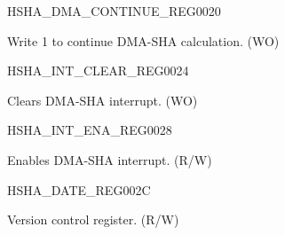 \begin{register}{H}{SHA\_DMA\_CONTINUE\_REG}{\hexprefix{}0020}\label{regdesc:SHADMACONTINUEREG}
%
%
\regnewline%
\begin{regdesc}\begin{reglist}
\label{fielddesc:SHADMACONTINUE}\item [SHA\_DMA\_CONTINUE] Write 1 to continue DMA-SHA calculation. (WO)
\end{reglist}\end{regdesc}
\end{register}


\begin{register}{H}{SHA\_INT\_CLEAR\_REG}{\hexprefix{}0024}\label{regdesc:SHAINTCLEARREG}
%
%
\regnewline%
\begin{regdesc}\begin{reglist}
\label{fielddesc:SHACLEARINTERRUPT}\item [SHA\_CLEAR\_INTERRUPT] Clears DMA-SHA interrupt. (WO)
\end{reglist}\end{regdesc}
\end{register}


\begin{register}{H}{SHA\_INT\_ENA\_REG}{\hexprefix{}0028}\label{regdesc:SHAINTENAREG}
%
%
\regnewline%
\begin{regdesc}\begin{reglist}
\label{fielddesc:SHAINTERRUPTENA}\item [SHA\_INTERRUPT\_ENA] Enables DMA-SHA interrupt. (R/W)
\end{reglist}\end{regdesc}
\end{register}


\begin{register}{H}{SHA\_DATE\_REG}{\hexprefix{}002C}\label{regdesc:SHADATEREG}
%
%
\regnewline%
\begin{regdesc}\begin{reglist}
\label{fielddesc:SHADATE}\item [SHA\_DATE] Version control register. (R/W)
\end{reglist}\end{regdesc}
\end{register}


